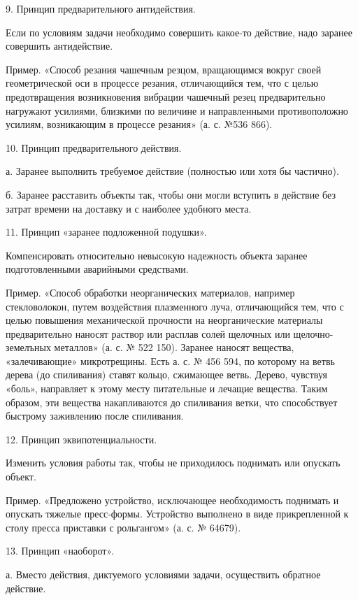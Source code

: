 9. Принцип предварительного антидействия.

Если по  условиям задачи необходимо совершить  какое-то действие, надо
заранее совершить антидействие.

Пример.   «Способ   резания   чашечным  резцом,   вращающимся   вокруг
своей  геометрической  оси  в   процессе  резания,  отличающийся  тем,
что   с   целью   предотвращения   возникновения   вибрации   чашечный
резец  предварительно  нагружают  усилиями,  близкими  по  величине  и
направленными противоположно усилиям,  возникающим в процессе резания»
(а. с. №536 866).

10. Принцип предварительного действия.

а.  Заранее  выполнить  требуемое  действие  (полностью  или  хотя  бы
частично).

б. Заранее расставить объекты так, чтобы они могли вступить в действие
без затрат времени на доставку и с наиболее удобного места.

11. Принцип «заранее подложенной подушки».

Компенсировать  относительно  невысокую   надежность  объекта  заранее
подготовленными аварийными средствами.

Пример.   «Способ   обработки  неорганических   материалов,   например
стекловолокон, путем  воздействия плазменного луча,  отличающийся тем,
что  с  целью  повышения   механической  прочности  на  неорганические
материалы предварительно  наносят раствор  или расплав  солей щелочных
или щелочно-земелъных  металлов» (а.  с. №  522 150).  Заранее наносят
вещества,  «залечивающие»  микротрещины. Есть  а.  с.  № 456  594,  по
которому  на ветвь  дерева  (до спиливания)  ставят кольцо,  сжимающее
ветвь. Дерево,  чувствуя «боль», направляет к  этому месту питательные
и  лечащие   вещества.  Таким  образом,  эти   вещества  накапливаются
до  спиливания  ветки,  что  способствует  быстрому  заживлению  после
спиливания.

12. Принцип эквипотенциальности.

Изменить  условия  работы  так,  чтобы не  приходилось  поднимать  или
опускать объект.

Пример.  «Предложено устройство,  исключающее необходимость  поднимать
и   опускать  тяжелые   пресс-формы.  Устройство   выполнено  в   виде
прикрепленной к столу пресса приставки с рольгангом» (а. с. № 64679).


13. Принцип «наоборот».

а. Вместо действия, диктуемого  условиями задачи, осуществить обратное
действие.


